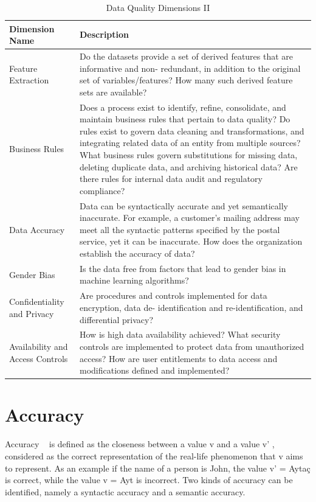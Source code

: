 \begin{table}
\caption{Data Quality Dimensions II}
\centering
\begin{tabular}{p{4.0cm} p{10cm}}
\toprule
\textbf{Dimension Name} & \textbf{Description} \\ 
\bottomrule
Feature Extraction & 
Do the datasets provide a set of derived features that are informative and non-
redundant, in addition to the original set of variables/features? How many such
derived feature sets are available? 
\\
Business Rules & 
Does a process exist to identify, refine, consolidate, and maintain business
rules that pertain to data quality? Do rules exist to govern data cleaning and
transformations, and integrating related data of an entity from multiple sources?
What business rules govern substitutions for missing data, deleting duplicate data,
and archiving historical data? Are there rules for internal data audit and regulatory
compliance? \\
Data Accuracy & 
Data can be syntactically accurate and yet semantically inaccurate. For example,
a customer's mailing address may meet all the syntactic patterns specified by the
postal service, yet it can be inaccurate. How does the organization establish the
accuracy of data? \\
Gender Bias & 
Is the data free from factors that lead to gender bias in machine learning
algorithms? \\
Confidentiality and Privacy & 
Are procedures and controls implemented for data encryption, data de-
identification and re-identification, and differential privacy? \\
Availability and Access Controls & 
How is high data availability achieved? What security controls are implemented to
protect data from unauthorized access? How are user entitlements to data access
and modifications defined and implemented? \\
\bottomrule
\end{tabular}
\end{table}


\section{Accuracy}

Accuracy ~\citep{Falorsi} is defined as the closeness between a value v and a value v' , considered as 
the correct representation of the real-life phenomenon that v aims to
represent. As an example if the name of a person is John, the value v' = Aytaç
is correct, while the value v = Ayt is incorrect. Two kinds of accuracy can be
identified, namely a syntactic accuracy and a semantic accuracy.

